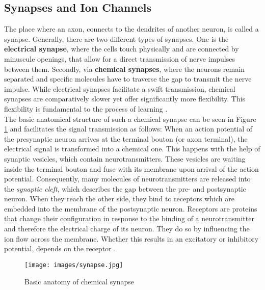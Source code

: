 \subsection{Synapses and Ion Channels}
    The place where an axon, connects to the dendrites of another neuron, is called a synapse. 
        Generally, there are two different types of synapses. One is the \textbf{electrical synapse}, where the cells touch physically and are connected by minuscule openings, that allow for a direct transmission of nerve impulses between them. Secondly, via \textbf{chemical synapses}, where the neurons remain separated and specific molecules have to traverse the gap to transmit the nerve impulse.
        While electrical synapses facilitate a swift transmission, chemical synapses are comparatively slower yet offer significantly more flexibility. This flexibility is fundamental to the process of learning \cite{thebrain-SimpleToComplex-mollecularAnatomy-b}. \\
        The basic anatomical structure of such a chemical synapse can be seen in Figure \ref{fig:synapse} and facilitates the signal transmission as follows:
        When an action potential of the presynaptic neuron arrives at the terminal bouton (or axon terminal), the electrical signal is transformed into a chemical one. This happens with the help of synaptic vesicles, which contain neurotransmitters. These vesicles are waiting inside the terminal bouton and fuse with its membrane upon arrival of the action potential. Consequently, many molecules of neurotransmitters are released into the \textit{synaptic cleft}, which describes the gap between the pre- and postsynaptic neuron. When they reach the other side, they bind to receptors which are embedded into the membrane of the postsynaptic neuron. Receptors are proteins that change their configuration in response to the binding of a neurotransmitter and therefore the electrical charge of its neuron. They do so by influencing the ion flow across the membrane. Whether this results in an excitatory or inhibitory potential, depends on the receptor \cite{Banich.2018}.
        
        \begin{figure}[H]
            \centering
            \texttt{[image: images/synapse.jpg]}
            \caption{Basic anatomy of chemical synapse}
            \label{fig:synapse}
        \end{figure}
        
